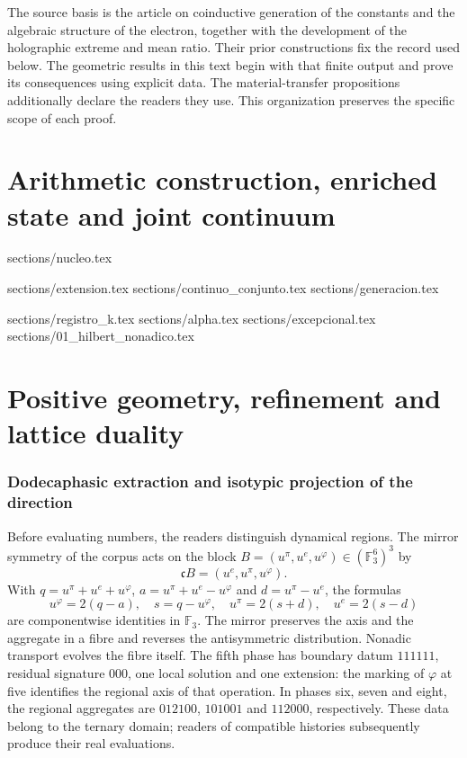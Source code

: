 \documentclass[a4paper,10pt]{article}
\theoremstyle{definition}\newtheorem{definition}[theorem]{Definition}
\theoremstyle{remark}\newtheorem{remark}[theorem]{Remark}
\newcommand{\TRIT}{\mathrm{TRIT}}\newcommand{\id}{\operatorname{id}}
\numberwithin{equation}{section}
\begin{document}
The source basis is the article on coinductive generation of the
constants and the algebraic structure of the electron, together with the
development of the holographic extreme and mean ratio. Their prior constructions fix
the record used below. The geometric results in this text begin
with that finite output and prove its consequences using explicit data. The
material-transfer propositions additionally declare the
readers they use. This organization preserves the specific scope of
each proof.

\clearpage
\part{Arithmetic construction, enriched state and joint continuum}
\begingroup
\sloppy
\renewcommand{\TRIT}{\{-1,0,+1\}}
{sections/nucleo.tex}
\clearpage

{sections/extension.tex}
{sections/continuo_conjunto.tex}
{sections/generacion.tex}
\clearpage



\clearpage
{sections/registro_k.tex}
{sections/alpha.tex}
{sections/excepcional.tex}
{sections/01_hilbert_nonadico.tex}
\endgroup
\clearpage
\part{Positive geometry, refinement and lattice duality}



\section{Dodecaphasic extraction and isotypic projection of the direction}
\label{sec:register}
Before evaluating numbers, the readers distinguish dynamical regions.
The mirror symmetry of the corpus acts on the block
\(B=(u^\pi,u^e,u^\varphi)\in(\mathbb F_3^6)^3\) by
\[
 \mathfrak cB=(u^e,u^\pi,u^\varphi).
\]
With \(q=u^\pi+u^e+u^\varphi\),
\(a=u^\pi+u^e-u^\varphi\) and \(d=u^\pi-u^e\), the formulas
\[
 u^\varphi=2(q-a),\quad s=q-u^\varphi,\quad
 u^\pi=2(s+d),\quad u^e=2(s-d)
\]
are componentwise identities in \(\mathbb F_3\). The mirror
preserves the axis and the aggregate in a fibre and reverses the
antisymmetric distribution. Nonadic transport evolves the fibre itself.
The fifth phase has boundary datum \(111111\), residual signature
\(000\), one local solution and one extension: the marking of
\(\varphi\) at five identifies the regional axis of that operation.
In phases six, seven and eight, the regional aggregates are
\(012100\), \(101001\) and \(112000\), respectively. These data
belong to the ternary domain; readers of compatible histories
subsequently produce their real evaluations.
\end{document}

